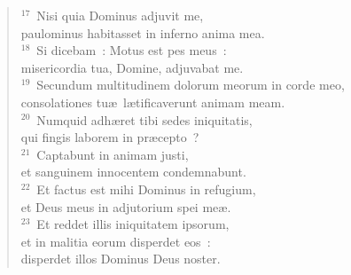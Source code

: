 \begin{verse}
${}^{17}$~Nisi quia Dominus adjuvit me,\\ paulominus habitasset in inferno anima mea.\\
${}^{18}$~Si dicebam~: Motus est pes meus~:\\ misericordia tua, Domine, adjuvabat me.\\
${}^{19}$~Secundum multitudinem dolorum meorum in corde meo,\\ consolationes tu\ae\ l\ae tificaverunt animam meam.\\
${}^{20}$~Numquid adh\ae ret tibi sedes iniquitatis,\\ qui fingis laborem in pr\ae cepto~?\\
${}^{21}$~Captabunt in animam justi,\\ et sanguinem innocentem condemnabunt.\\
${}^{22}$~Et factus est mihi Dominus in refugium,\\ et Deus meus in adjutorium spei me\ae .\\
${}^{23}$~Et reddet illis iniquitatem ipsorum,\\ et in malitia eorum disperdet eos~:\\ disperdet illos Dominus Deus noster.\end{verse}



